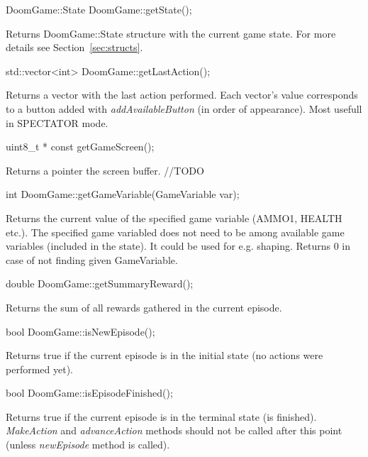 \vspace{20pt}
\begin{clinee}
	DoomGame::State DoomGame::getState();
\end{clinee}

	Returns DoomGame::State structure with the current game state. For more details see Section~\ref{sec:structs}.


\vspace{20pt}
\begin{clinee}
	std::vector<int> DoomGame::getLastAction();
\end{clinee}
	Returns a vector with the last action performed. Each vector's value corresponds to a button added with \emph{addAvailableButton} (in order of appearance). Most usefull in SPECTATOR mode.


\vspace{20pt}
\begin{clinee}
	uint8_t * const getGameScreen();
\end{clinee}
	Returns a pointer the screen buffer. //TODO

\vspace{20pt}
\begin{clinee}
	int DoomGame::getGameVariable(GameVariable var);
\end{clinee}

	Returns the current value of the specified game variable (AMMO1, HEALTH etc.). The specified game variabled does not need to be among available game variables (included in the state).
	It could be used for e.g. shaping. Returns 0 in case of not finding given GameVariable.


\vspace{20pt}
\begin{clinee}
	double DoomGame::getSummaryReward();
\end{clinee}

	Returns the sum of all rewards gathered in the current episode.


\vspace{20pt}
\begin{clinee}
	bool DoomGame::isNewEpisode();
\end{clinee}

	Returns true if the current episode is in the initial state (no actions were performed yet).


\vspace{20pt}
\begin{clinee}
	bool DoomGame::isEpisodeFinished();
\end{clinee}
	Returns true if the current episode is in the terminal state (is finished). \emph{MakeAction} and \emph{advanceAction} methods should not be called after this point (unless \emph{newEpisode} method is called).



